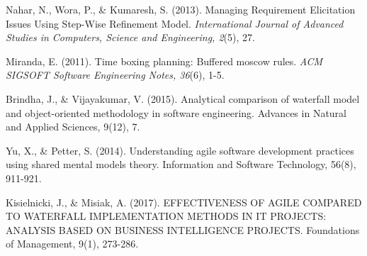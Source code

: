 \documentclass[12pt,a4paper]{article}
\begin{document}
\begin{thebibliography}{9}
  Nahar, N., Wora, P., \& Kumaresh, S. (2013). Managing Requirement Elicitation Issues Using Step-Wise Refinement Model. \textit{International Journal of Advanced Studies in Computers, Science and Engineering, 2}(5), 27.

  Miranda, E. (2011). Time boxing planning: Buffered moscow rules. \textit{ACM SIGSOFT Software Engineering Notes, 36}(6), 1-5.
  
  Brindha, J., \& Vijayakumar, V. (2015). Analytical comparison of waterfall model and object-oriented methodology in software engineering. Advances in Natural and Applied Sciences, 9(12), 7.
  
  Yu, X., \& Petter, S. (2014). Understanding agile software development practices using shared mental models theory. Information and Software Technology, 56(8), 911-921.
  
  Kisielnicki, J., \& Misiak, A. (2017). EFFECTIVENESS OF AGILE COMPARED TO WATERFALL IMPLEMENTATION METHODS IN IT PROJECTS: ANALYSIS BASED ON BUSINESS INTELLIGENCE PROJECTS. Foundations of Management, 9(1), 273-286.
\end{thebibliography}
\end{document}
